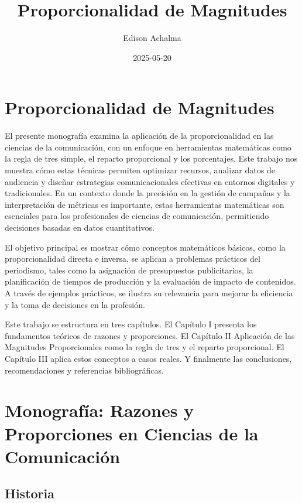 \documentclass[
  stu,
  floatsintext,
  longtable,
  a4paper,
  nolmodern,
  notxfonts,
  notimes,
  colorlinks=true,linkcolor=blue,citecolor=blue,urlcolor=blue]{apa7}
\title{Proporcionalidad de Magnitudes}
\author{Edison Achalma}
\affiliation{
{Escuela Profesional de Economía, Universidad Nacional de San Cristóbal
de Huamanga}}
\date{2025-05-20}
\begin{document}
\maketitle

\hypertarget{toc}{}
\tableofcontents
\newpage
\section[Introduction]{Proporcionalidad de Magnitudes}

\setcounter{secnumdepth}{3}

\setlength\LTleft{0pt}


El presente monografía examina la aplicación de la proporcionalidad en
las ciencias de la comunicación, con un enfoque en herramientas
matemáticas como la regla de tres simple, el reparto proporcional y los
porcentajes. Este trabajo nos muestra cómo estas técnicas permiten
optimizar recursos, analizar datos de audiencia y diseñar estrategias
comunicacionales efectivas en entornos digitales y tradicionales. En un
contexto donde la precisión en la gestión de campañas y la
interpretación de métricas es importante, estas herramientas matemáticas
son esenciales para los profesionales de ciencias de comunicación,
permitiendo decisiones basadas en datos cuantitativos.

El objetivo principal es mostrar cómo conceptos matemáticos básicos,
como la proporcionalidad directa e inversa, se aplican a problemas
prácticos del periodismo, tales como la asignación de presupuestos
publicitarios, la planificación de tiempos de producción y la evaluación
de impacto de contenidos. A través de ejemplos prácticos, se ilustra su
relevancia para mejorar la eficiencia y la toma de decisiones en la
profesión.

Este trabajo se estructura en tres capítulos. El Capítulo I presenta los
fundamentos teóricos de razones y proporciones. El Capítulo II
Aplicación de las Magnitudes Proporcionales como la regla de tres y el
reparto proporcional. El Capítulo III aplica estos conceptos a casos
reales. Y finalmente las conclusiones, recomendaciones y referencias
bibliográficas.

\section{Monografía: Razones y Proporciones en Ciencias de la
Comunicación}\label{monografuxeda-razones-y-proporciones-en-ciencias-de-la-comunicaciuxf3n}

\subsection{Historia}\label{historia}
\end{document}

